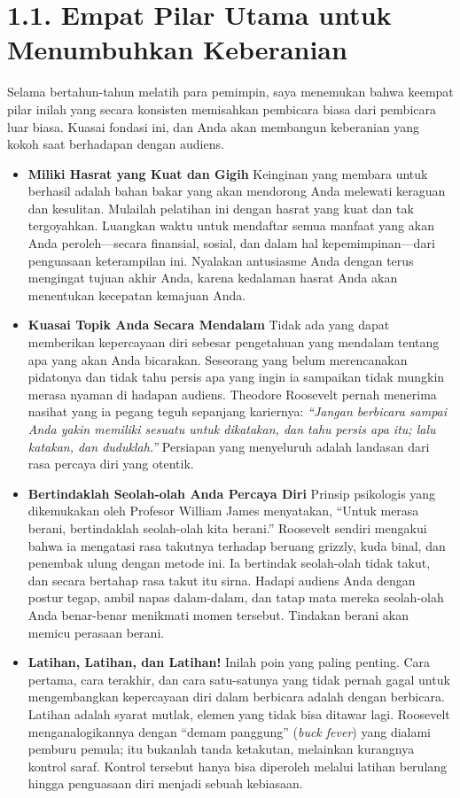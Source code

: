 \documentclass[
  letterpaper,
  DIV=11,
  numbers=noendperiod]{scrreprt}
\begin{document}
\section{\texorpdfstring{\textbf{1.1. Empat Pilar Utama untuk
Menumbuhkan
Keberanian}}{1.1. Empat Pilar Utama untuk Menumbuhkan Keberanian}}\label{empat-pilar-utama-untuk-menumbuhkan-keberanian}

Selama bertahun-tahun melatih para pemimpin, saya menemukan bahwa
keempat pilar inilah yang secara konsisten memisahkan pembicara biasa
dari pembicara luar biasa. Kuasai fondasi ini, dan Anda akan membangun
keberanian yang kokoh saat berhadapan dengan audiens.

\begin{itemize}
\item
  \textbf{Miliki Hasrat yang Kuat dan Gigih} Keinginan yang membara
  untuk berhasil adalah bahan bakar yang akan mendorong Anda melewati
  keraguan dan kesulitan. Mulailah pelatihan ini dengan hasrat yang kuat
  dan tak tergoyahkan. Luangkan waktu untuk mendaftar semua manfaat yang
  akan Anda peroleh---secara finansial, sosial, dan dalam hal
  kepemimpinan---dari penguasaan keterampilan ini. Nyalakan antusiasme
  Anda dengan terus mengingat tujuan akhir Anda, karena kedalaman hasrat
  Anda akan menentukan kecepatan kemajuan Anda.
\item
  \textbf{Kuasai Topik Anda Secara Mendalam} Tidak ada yang dapat
  memberikan kepercayaan diri sebesar pengetahuan yang mendalam tentang
  apa yang akan Anda bicarakan. Seseorang yang belum merencanakan
  pidatonya dan tidak tahu persis apa yang ingin ia sampaikan tidak
  mungkin merasa nyaman di hadapan audiens. Theodore Roosevelt pernah
  menerima nasihat yang ia pegang teguh sepanjang kariernya:
  \emph{``Jangan berbicara sampai Anda yakin memiliki sesuatu untuk
  dikatakan, dan tahu persis apa itu; lalu katakan, dan duduklah.''}
  Persiapan yang menyeluruh adalah landasan dari rasa percaya diri yang
  otentik.
\item
  \textbf{Bertindaklah Seolah-olah Anda Percaya Diri} Prinsip psikologis
  yang dikemukakan oleh Profesor William James menyatakan, ``Untuk
  merasa berani, bertindaklah seolah-olah kita berani.'' Roosevelt
  sendiri mengakui bahwa ia mengatasi rasa takutnya terhadap beruang
  grizzly, kuda binal, dan penembak ulung dengan metode ini. Ia
  bertindak seolah-olah tidak takut, dan secara bertahap rasa takut itu
  sirna. Hadapi audiens Anda dengan postur tegap, ambil napas
  dalam-dalam, dan tatap mata mereka seolah-olah Anda benar-benar
  menikmati momen tersebut. Tindakan berani akan memicu perasaan berani.
\item
  \textbf{Latihan, Latihan, dan Latihan!} Inilah poin yang paling
  penting. Cara pertama, cara terakhir, dan cara satu-satunya yang tidak
  pernah gagal untuk mengembangkan kepercayaan diri dalam berbicara
  adalah dengan berbicara. Latihan adalah syarat mutlak, elemen yang
  tidak bisa ditawar lagi. Roosevelt menganalogikannya dengan ``demam
  panggung'' (\emph{buck fever}) yang dialami pemburu pemula; itu
  bukanlah tanda ketakutan, melainkan kurangnya kontrol saraf. Kontrol
  tersebut hanya bisa diperoleh melalui latihan berulang hingga
  penguasaan diri menjadi sebuah kebiasaan.
\end{itemize}
\end{document}
